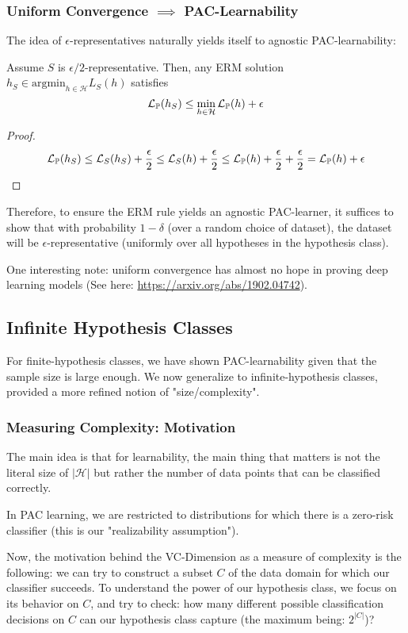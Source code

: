 \documentclass[11pt]{scrartcl}
\begin{document}
\subsubsection{Uniform Convergence $\implies$ PAC-Learnability}
The idea of $\epsilon$-representatives naturally yields itself to agnostic PAC-learnability: \begin{lemma}
Assume $S$ is $\epsilon/2$-representative. Then, any ERM solution $h_S \in \text{argmin}_{h \in \mathcal{H}}L_S(h)$ satisfies $$\mathcal{L}_{\mathbb{P}}(h_S) \le \min_{h \in \mathcal{H}}\mathcal{L}_{\mathbb{P}}(h)+\epsilon$$
\end{lemma}
\begin{proof}
$$\mathcal{L}_{\mathbb{P}}(h_S) \le \mathcal{L}_{S}(h_S)+\frac{\epsilon}{2} \le \mathcal{L}_{S}(h)+\frac{\epsilon}{2} \le \mathcal{L}_{\mathbb{P}}(h)+\frac{\epsilon}{2}+\frac{\epsilon}{2}=\mathcal{L}_{\mathbb{P}}(h)+\epsilon$$
\end{proof}
Therefore, to ensure the ERM rule yields an agnostic PAC-learner, it suffices to show that with probability $1-\delta$ (over a random choice of dataset), the dataset will be $\epsilon$-representative (uniformly over all hypotheses in the hypothesis class).

One interesting note: uniform convergence has almost no hope in proving deep learning models (See here: \url{https://arxiv.org/abs/1902.04742}). 

\subsection{Infinite Hypothesis Classes}
For finite-hypothesis classes, we have shown PAC-learnability given that the sample size is large enough. We now generalize to infinite-hypothesis classes, provided a more refined notion of "size/complexity". 

\subsubsection{Measuring Complexity: Motivation}
The main idea is that for learnability, the main thing that matters is not the literal size of $|\mathcal{H}|$ but rather the number of data points that can be classified correctly.

In PAC learning, we are restricted to distributions for which there is a zero-risk classifier (this is our "realizability assumption"). 

Now, the motivation behind the VC-Dimension as a measure of complexity is the following: we can try to construct a subset $C$ of the data domain for which our classifier succeeds. To understand the power of our hypothesis class, we focus on its behavior on $C$, and try to check: how many different possible classification decisions on $C$ can our hypothesis class capture (the maximum being: $2^{|C|}$)?
\end{document}

